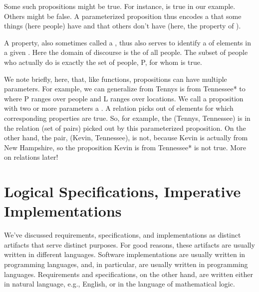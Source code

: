 \documentclass[letterpaper,10pt,english]{sphinxmanual}
\begin{document}
Some such propositions might be true. For instance,
 is true in our example. Others might be false. A
parameterized proposition thus encodes a  that some things
(here people) have and that others don’t have (here, the property of
).

A property, also sometimes called a , thus also serves to
identify a  of elements in a given . Here
the domain of discourse is the of all people. The subset of people who
actually do  is exactly the set of people, P, for whom
 is true.

We note briefly, here, that, like functions, propositions can have
multiple parameters. For example, we can generalize from  Tennys is from Tennessee* to  where P ranges over people and L ranges over locations. We
call a proposition with two or more parameters a . A
relation picks out  of elements for which corresponding
properties are true. So, for example, the  (Tennys, Tennessee)
is in the relation (set of  pairs) picked out by this
parameterized proposition. On the other hand, the pair, (Kevin,
Tennessee), is not, because Kevin is actually from New Hampshire, so
the proposition  Kevin is from Tennessee*
is not true. More on relations later!


\chapter{Logical Specifications, Imperative Implementations}
\label{\detokenize{02-logic-and-code::doc}}\label{\detokenize{02-logic-and-code:logical-specifications-imperative-implementations}}
We’ve discussed requirements, specifications, and implementations as
distinct artifacts that serve distinct purposes. For good reasons,
these artifacts are usually written in different languages. Software
implementations are usually written in programming languages, and, in
particular, are usually written in  programming languages.
Requirements and specifications, on the other hand, are written either
in natural language, e.g., English, or in the language of mathematical
logic.
\end{document}
